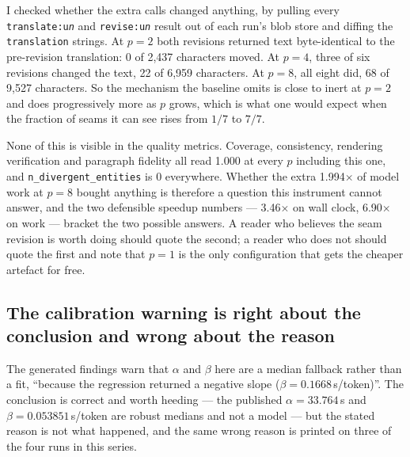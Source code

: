 \documentclass[11pt]{article}
\begin{document}
I checked whether the extra calls changed anything, by pulling every \texttt{translate:u\emph{n}}
and \texttt{revise:u\emph{n}} result out of each run's blob store and diffing the
\texttt{translation} strings. At $p=2$ both revisions returned text byte-identical to the
pre-revision translation: 0 of 2{,}437 characters moved. At $p=4$, three of six revisions changed
the text, 22 of 6{,}959 characters. At $p=8$, all eight did, 68 of 9{,}527 characters. So the
mechanism the baseline omits is close to inert at $p=2$ and does progressively more as $p$ grows,
which is what one would expect when the fraction of seams it can see rises from $1/7$ to $7/7$.

None of this is visible in the quality metrics. Coverage, consistency, rendering verification and
paragraph fidelity all read 1.000 at every $p$ including this one, and
\texttt{n\_divergent\_entities} is 0 everywhere. Whether the extra 1.994$\times$ of model work at
$p=8$ bought anything is therefore a question this instrument cannot answer, and the two
defensible speedup numbers --- 3.46$\times$ on wall clock, 6.90$\times$ on work --- bracket the
two possible answers. A reader who believes the seam revision is worth doing should quote the
second; a reader who does not should quote the first and note that $p=1$ is the only configuration
that gets the cheaper artefact for free.

\subsection*{The calibration warning is right about the conclusion and wrong about the reason}

The generated findings warn that $\alpha$ and $\beta$ here are a median fallback rather than a
fit, ``because the regression returned a negative slope ($\beta=0.1668$\,s/token)''. The
conclusion is correct and worth heeding --- the published $\alpha=33.764$\,s and
$\beta=0.053851$\,s/token are robust medians and not a model --- but the stated reason is not what
happened, and the same wrong reason is printed on three of the four runs in this series.
\end{document}
